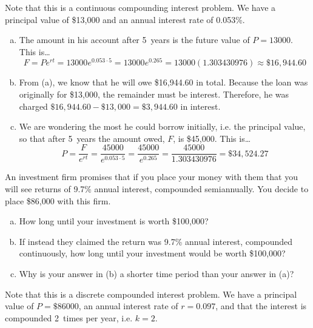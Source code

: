 \documentclass[11pt,letterpaper]{article}
\begin{document}
\sol Note that this is a continuous compounding interest problem. We have a principal value of \$13,000 and an annual interest rate of 0.053\%. 
\begin{enumerate}[(a)]
\item The amount in his account after 5~years is the future value of $P= 13000$. This is\dots
	\[
	F= Pe^{rt}= 13000 e^{0.053 \cdot 5}= 13000 e^{0.265}= 13000 (1.303430976) \approx \$16,944.60
	\] \pspace 

\item From (a), we know that he will owe \$16,944.60 in total. Because the loan was originally for \$13,000, the remainder must be interest. Therefore, he was charged $\$16,944.60 - \$13,000= \$3,944.60$ in interest. \pspace

\item We are wondering the most he could borrow initially, i.e. the principal value, so that after 5~years the amount owed, $F$, is \$45,000. This is\dots
	\[
	P= \dfrac{F}{e^{rt}}= \dfrac{45000}{e^{0.053 \cdot 5}}= \dfrac{45000}{e^{0.265}}= \dfrac{45000}{1.303430976}= \$34,524.27
	\]
\end{enumerate}



\newpage



 An investment firm promises that if you place your money with them that you will see returns of 9.7\% annual interest, compounded semiannually. You decide to place \$86,000 with this firm. 
	\begin{enumerate}[(a)]
	\item How long until your investment is worth \$100,000?
	\item If instead they claimed the return was 9.7\% annual interest, compounded continuously, how long until your investment would be worth \$100,000?
	\item Why is your answer in (b) a shorter time period than your answer in (a)?
	\end{enumerate} \pspace

\sol Note that this is a discrete compounded interest problem. We have a principal value of $P= \$86000$, an annual interest rate of $r= 0.097$, and that the interest is compounded 2~times per year, i.e. $k= 2$.
\end{document}
